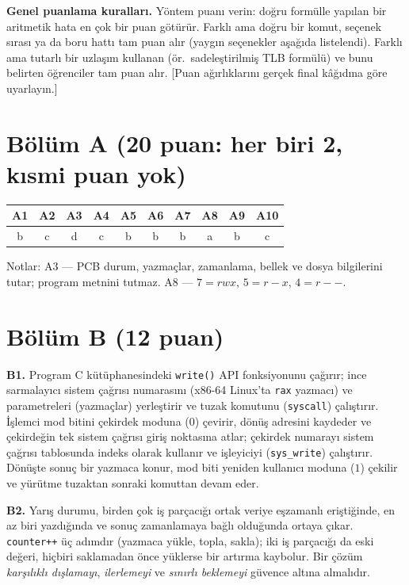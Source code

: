 \textbf{Genel puanlama kuralları.} Yöntem puanı verin: doğru formülle yapılan bir aritmetik hata en çok bir puan götürür. Farklı ama doğru bir komut, seçenek sırası ya da boru hattı tam puan alır (yaygın seçenekler aşağıda listelendi). Farklı ama tutarlı bir uzlaşım kullanan (ör.\ sadeleştirilmiş TLB formülü) ve bunu belirten öğrenciler tam puan alır. [Puan ağırlıklarını gerçek final kâğıdına göre uyarlayın.]

\section*{Bölüm A (20 puan: her biri 2, kısmi puan yok)}
\begin{center}
\renewcommand{\arraystretch}{1.3}
\begin{tabular}{|*{10}{c|}}
\hline
A1 & A2 & A3 & A4 & A5 & A6 & A7 & A8 & A9 & A10 \\ \hline
b & c & d & c & b & b & b & a & b & c \\ \hline
\end{tabular}
\end{center}
Notlar: A3 --- PCB durum, yazmaçlar, zamanlama, bellek ve dosya bilgilerini tutar; program metnini tutmaz. A8 --- $7 = rwx$, $5 = r{-}x$, $4 = r{-}{-}$.

\section*{Bölüm B (12 puan)}
\textbf{B1.} Program C kütüphanesindeki \texttt{write()} API fonksiyonunu çağırır; ince sarmalayıcı sistem çağrısı numarasını (x86-64 Linux'ta \texttt{rax} yazmacı) ve parametreleri (yazmaçlar) yerleştirir ve tuzak komutunu (\texttt{syscall}) çalıştırır. İşlemci mod bitini çekirdek moduna ($0$) çevirir, dönüş adresini kaydeder ve çekirdeğin tek sistem çağrısı giriş noktasına atlar; çekirdek numarayı sistem çağrısı tablosunda indeks olarak kullanır ve işleyiciyi (\texttt{sys\_write}) çalıştırır. Dönüşte sonuç bir yazmaca konur, mod biti yeniden kullanıcı moduna ($1$) çekilir ve yürütme tuzaktan sonraki komuttan devam eder.

\textbf{B2.} Yarış durumu, birden çok iş parçacığı ortak veriye eşzamanlı eriştiğinde, en az biri yazdığında ve sonuç zamanlamaya bağlı olduğunda ortaya çıkar. \texttt{counter++} üç adımdır (yazmaca yükle, topla, sakla); iki iş parçacığı da eski değeri, hiçbiri saklamadan önce yüklerse bir artırma kaybolur. Bir çözüm \emph{karşılıklı dışlamayı}, \emph{ilerlemeyi} ve \emph{sınırlı beklemeyi} güvence altına almalıdır.

